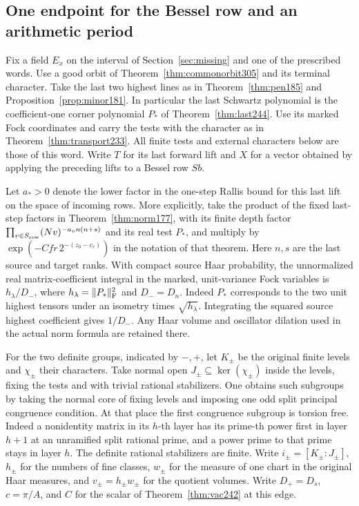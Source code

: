 \documentclass[a4paper,11pt]{article}
\theoremstyle{definition}
\theoremstyle{remark}
\numberwithin{equation}{section}
\begin{document}
\subsection{One endpoint for the Bessel row and an arithmetic period}\label{nav:VIII-60}
Fix a field \(E_x\) on the interval of Section~\ref{sec:missing}
and one of the prescribed words. Use a good orbit of
Theorem~\ref{thm:commonorbit305} and its terminal character.
Take the last two highest lines as in Theorem~\ref{thm:pen185}
and Proposition~\ref{prop:minor181}. In particular the last
Schwartz polynomial is the coefficient-one corner polynomial
\(P_*\) of Theorem~\ref{thm:last244}. Use its marked Fock
coordinates and carry the tests with the character as in
Theorem~\ref{thm:transport233}. All finite tests and external
characters below are those of this word. Write \(T\) for its
last forward lift and \(X\) for a vector obtained by applying
the preceding lifts to a Bessel row \(Sb\).

Let \(a_*>0\) denote the lower factor in the one-step Rallis
bound for this last lift on the space of incoming rows.
More explicitly, take the product of the fixed last-step
factors in Theorem~\ref{thm:norm177}, with its finite depth
factor \(\prod_{v\in S_{\rm row}}(Nv)^{-a_v n(n+s)}\) and its
real test \(P_*\), and multiply by
\(\exp(-Cfr\,2^{-(z_0-c_r)})\) in the notation of that theorem.
Here \(n,s\) are the last source and target ranks. With compact
source Haar probability, the unnormalized real matrix-coefficient
integral in the marked, unit-variance Fock variables is
\(h_\lambda/D_-\), where \(h_\lambda=\|P_*\|_{\rm F}^2\) and
\(D_-=D_n\). Indeed \(P_*\) corresponds to the two unit highest
tensors under an isometry times \(\sqrt{h_\lambda}\).
Integrating the squared source highest coefficient gives
\(1/D_-\). Any Haar volume and oscillator dilation used in
the actual norm formula are retained there.

For the two definite groups, indicated by \(-,+\), let \(K_\pm\)
be the original finite levels and \(\chi_\pm\) their characters.
Take normal open \(J_\pm\subseteq\ker(\chi_\pm)\) inside the
levels, fixing the tests and with trivial rational stabilizers.
One obtains such subgroups by taking the normal core of fixing
levels and imposing one odd split principal congruence condition.
At that place the first congruence subgroup is torsion free.
Indeed a nonidentity matrix in its \(h\)-th layer has its
prime-th power first in layer \(h+1\) at an unramified split
rational prime, and a power prime to that prime stays in layer
\(h\). The definite rational stabilizers are finite. Write
\(i_\pm=[K_\pm:J_\pm]\), \(h_\pm\) for the numbers of fine
classes, \(w_\pm\) for the measure of one chart in the original
Haar measures, and \(v_\pm=h_\pm w_\pm\) for the quotient volumes.
Write \(D_+=D_s\), \(c=\pi/A\), and \(C\) for the scalar of
Theorem~\ref{thm:vac242} at this edge.
\end{document}
